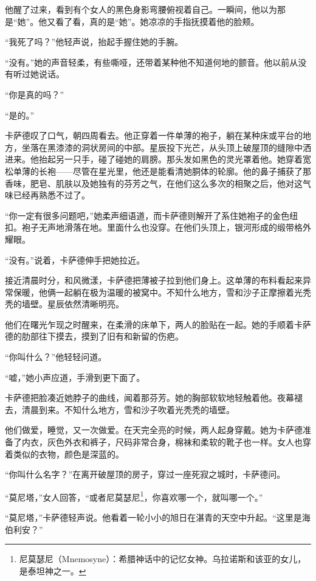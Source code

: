 \documentclass[AutoFakeBold=true]{book}
\begin{document}
他醒了过来，看到有个女人的黑色身影弯腰俯视着自己。一瞬间，他以为那是``她''。他又看了看，真的是``她''。她凉凉的手指抚摸着他的脸颊。

``我死了吗？''他轻声说，抬起手握住她的手腕。

``没有。''她的声音轻柔，有些嘶哑，还带着某种他不知道何地的颤音。他以前从没有听过她说话。

``你是真的吗？''

``是的。''

卡萨德叹了口气，朝四周看去。他正穿着一件单薄的袍子，躺在某种床或平台的地方，坐落在黑漆漆的洞状房间的中部。星辰投下光芒，从头顶上破屋顶的缝隙中洒进来。他抬起另一只手，碰了碰她的肩膀。那头发如黑色的灵光罩着他。她穿着宽松单薄的长袍——尽管在星光里，他还是能看清她胴体的轮廓。他的鼻子捕获了那香味，肥皂、肌肤以及她独有的芬芳之气，在他们这么多次的相聚之后，他对这气味已经再熟悉不过了。

``你一定有很多问题吧，''她柔声细语道，而卡萨德则解开了系住她袍子的金色纽扣。袍子无声地滑落在地。里面什么也没穿。在他们头顶上，银河形成的缎带格外耀眼。

``没有。''说着，卡萨德伸手把她拉近。

\vspace*{1em}

接近清晨时分，和风微漾，卡萨德把薄被子拉到他们身上。这单薄的布料看起来异常保暖，他俩一起躺在极为温暖的被窝中。不知什么地方，雪和沙子正摩擦着光秃秃的墙壁。星辰依然清晰明亮。

他们在曙光乍现之时醒来，在柔滑的床单下，两人的脸贴在一起。她的手顺着卡萨德的肋部往下摸去，摸到了旧有和新留的伤疤。

``你叫什么？''他轻轻问道。

``嘘，''她小声应道，手滑到更下面了。

卡萨德把脸凑近她脖子的曲线，闻着那芬芳。她的胸部软软地轻触着他。夜幕褪去，清晨到来。不知什么地方，雪和沙子吹着光秃秃的墙壁。

他们做爱，睡觉，又一次做爱。在天完全亮的时候，两人起身穿戴。她为卡萨德准备了内衣，灰色外衣和裤子，尺码非常合身，棉袜和柔软的靴子也一样。女人也穿着类似的衣物，颜色是深蓝的。

``你叫什么名字？''在离开破屋顶的房子，穿过一座死寂之城时，卡萨德问。

``莫尼塔，''女人回答，``或者尼莫瑟尼\footnote{尼莫瑟尼（Mnemosyne）：希腊神话中的记忆女神。乌拉诺斯和该亚的女儿，是泰坦神之一。}，你喜欢哪一个，就叫哪一个。''

``莫尼塔，''卡萨德轻声说。他看着一轮小小的旭日在湛青的天空中升起。``这里是海伯利安？''
\end{document}
